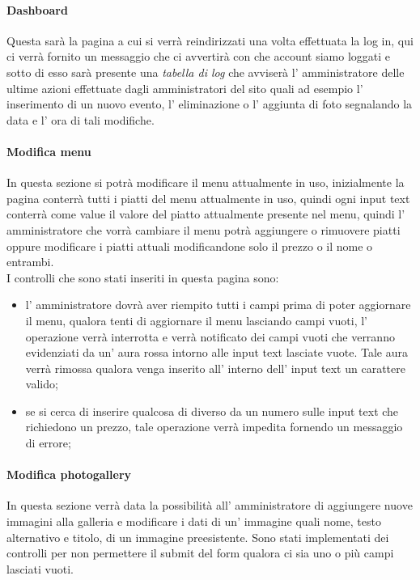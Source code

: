 \paragraph{Dashboard}
Questa sarà la pagina a cui si verrà reindirizzati una volta effettuata la log in, qui ci verrà fornito un messaggio che ci avvertirà con che account siamo loggati e sotto di esso sarà presente una \emph{tabella di log} che avviserà l' amministratore delle ultime azioni effettuate dagli amministratori del sito quali ad esempio l' inserimento di un nuovo evento, l' eliminazione o l' aggiunta di foto segnalando la data e l' ora di tali modifiche.
\paragraph{Modifica menu}
In questa sezione si potrà modificare il menu attualmente in uso, inizialmente la pagina conterrà tutti i piatti del menu attualmente in uso, quindi ogni input text conterrà come value il valore del piatto attualmente presente nel menu, quindi l' amministratore che vorrà cambiare il menu potrà aggiungere o rimuovere piatti oppure modificare i piatti attuali modificandone solo il prezzo o il nome o entrambi.\\
I controlli che sono stati inseriti in questa pagina sono:
\begin{itemize}
	\item l' amministratore dovrà aver riempito tutti i campi prima di poter aggiornare il menu, qualora tenti di aggiornare il menu lasciando campi vuoti, l' operazione verrà interrotta e verrà notificato dei campi vuoti che verranno evidenziati da un' aura rossa intorno alle input text lasciate vuote. Tale aura verrà rimossa qualora venga inserito all' interno dell' input text un carattere valido;
	\item se si cerca di inserire qualcosa di diverso da un numero sulle input text che richiedono un prezzo, tale operazione verrà impedita fornendo un messaggio di errore;
\end{itemize}
\paragraph{Modifica photogallery}
In questa sezione verrà data la possibilità all' amministratore di aggiungere nuove immagini alla galleria e modificare i dati di un' immagine quali nome, testo alternativo e titolo, di un immagine preesistente. Sono stati implementati dei controlli per non permettere il submit del form qualora ci sia uno o più campi lasciati vuoti.
